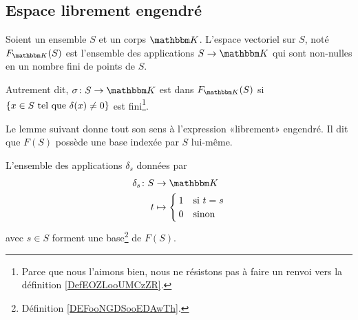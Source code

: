 \subsection{Espace librement engendré}

\begin{definition}       \label{DEFooCPNIooNxsYMY}
    Soient un ensemble \( S\) et un corps \(\eK \). L'espace vectoriel  sur \( S\), noté \( F_{\eK}(S)\) est l'ensemble des applications \( S\to \eK\) qui sont non-nulles en un nombre fini de points de \( S\).

    Autrement dit, \( \sigma\colon S\to \eK\) est dans \( F_{\eK}(S) \) si \( \{ x\in S\text{ tel que } \delta(x)\neq 0 \}\) est fini\footnote{Parce que nous l'aimons bien, nous ne résistons pas à faire un renvoi vers la définition \ref{DefEOZLooUMCzZR}.}.
\end{definition}

Le lemme suivant donne tout son sens à l'expression «librement» engendré. Il dit que \( F(S)\) possède une base indexée par \( S\) lui-même.
\begin{lemma}       \label{LEMooLOPAooUNQVku}
    L'ensemble des applications \( \delta_s\) données par
    \begin{equation}
        \begin{aligned}
            \delta_s\colon S&\to \eK \\
            t&\mapsto \begin{cases}
                1    &   \text{si } t=s\\
                0    &    \text{sinon }
            \end{cases}
        \end{aligned}
    \end{equation}
    avec \( s\in S\) forment une base\footnote{Définition \ref{DEFooNGDSooEDAwTh}.} de \( F(S)\).
\end{lemma}

